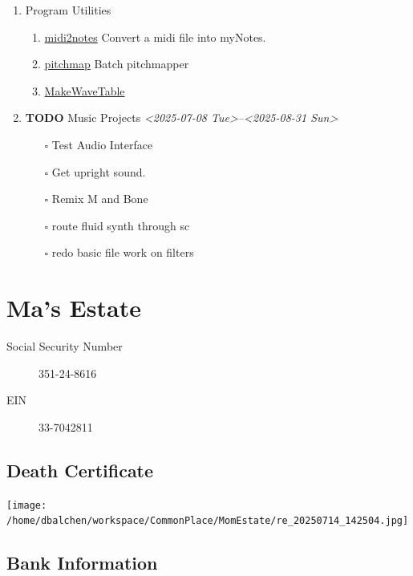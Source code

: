 \documentclass[12pt,twoside]{article}
\begin{document}
\begin{enumerate}
\item Program Utilities
\label{sec:org3578c29}
\begin{enumerate}
\item \href{file:///home/dbalchen/workspace/RoboComp/midi2notes.py}{midi2notes}
\label{sec:orgb6f177a}
Convert a midi file into myNotes.
\item \href{file:///home/dbalchen/workspace/RoboComp/pitchmap.py}{pitchmap}
\label{sec:org3282ee5}
Batch pitchmapper
\item \href{../../Music/SuperCollider/include/functions/makeWaveTable.sc}{MakeWaveTable}
\label{sec:orgbc274f2}
\end{enumerate}
\item {\bfseries\sffamily TODO} Music Projects
\label{sec:org35bec79}
\textit{<2025-07-08 Tue>--<2025-08-31 Sun>}
\begin{itemize}
\item[{$\square$}] Test Audio Interface
\item[{$\square$}] Get upright sound.
\item[{$\square$}] Remix M and Bone
\item[{$\square$}] route fluid synth through sc
\item[{$\square$}] redo basic file work on filters
\end{itemize}
\end{enumerate}
\section{Ma's Estate}
\label{sec:orgc029907}
\begin{description}
\item[{Social Security Number}] 351-24-8616
\item[{EIN}] 33-7042811
\end{description}
\subsection{Death Certificate}
\label{sec:org4ce7bd5}
\begin{center}
\texttt{[image: /home/dbalchen/workspace/CommonPlace/MomEstate/re\_20250714\_142504.jpg]}
\end{center}
\subsection{Bank Information}
\label{sec:org145a3a8}
\end{document}
